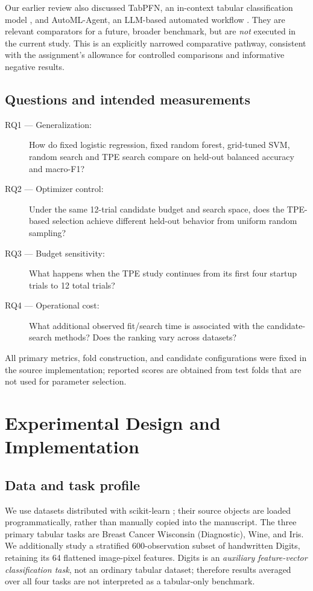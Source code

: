 \documentclass[11pt,a4paper]{article}
\begin{document}
Our earlier review also discussed TabPFN, an in-context tabular classification model \cite{hollmann2023}, and AutoML-Agent, an LLM-based automated workflow \cite{trirat2025}. They are relevant comparators for a future, broader benchmark, but are \emph{not} executed in the current study. This is an explicitly narrowed comparative pathway, consistent with the assignment's allowance for controlled comparisons and informative negative results.

\subsection{Questions and intended measurements}
\begin{description}
\item[RQ1 --- Generalization:] How do fixed logistic regression, fixed random forest, grid-tuned SVM, random search and TPE search compare on held-out balanced accuracy and macro-F1?
\item[RQ2 --- Optimizer control:] Under the same 12-trial candidate budget and search space, does the TPE-based selection achieve different held-out behavior from uniform random sampling?
\item[RQ3 --- Budget sensitivity:] What happens when the TPE study continues from its first four startup trials to 12 total trials?
\item[RQ4 --- Operational cost:] What additional observed fit/search time is associated with the candidate-search methods? Does the ranking vary across datasets?
\end{description}
All primary metrics, fold construction, and candidate configurations were fixed in the source implementation; reported scores are obtained from test folds that are not used for parameter selection.

\section{Experimental Design and Implementation}
\subsection{Data and task profile}
We use datasets distributed with scikit-learn \cite{pedregosa2011}; their source objects are loaded programmatically, rather than manually copied into the manuscript. The three primary tabular tasks are Breast Cancer Wisconsin (Diagnostic), Wine, and Iris. We additionally study a stratified 600-observation subset of handwritten Digits, retaining its 64 flattened image-pixel features. Digits is an \emph{auxiliary feature-vector classification task}, not an ordinary tabular dataset; therefore results averaged over all four tasks are not interpreted as a tabular-only benchmark.
\end{document}
